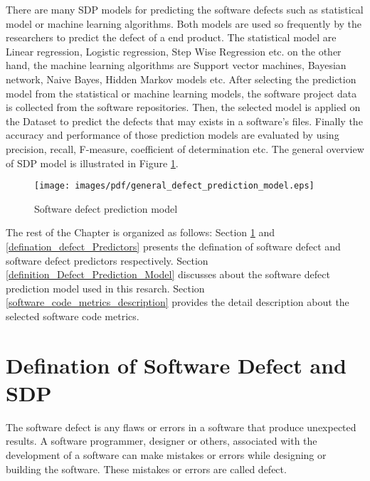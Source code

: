 \documentclass[12pt]{report}
\begin{document}
%
There are many SDP models for predicting the software defects such as statistical model or machine learning algorithms. Both models are used so frequently by the researchers to predict the defect of a end product. The statistical model are Linear regression, Logistic regression, Step Wise Regression etc. on the other hand, the machine learning algorithms are Support vector machines, Bayesian network, Naive Bayes, Hidden Markov models etc.
After selecting the prediction model from the statistical or machine learning models, the software project data is collected from the software repositories. Then, the selected model is applied on the Dataset to predict the defects that may exists in a software's files. Finally the accuracy and performance of those prediction models are evaluated by using precision, recall, F-measure, coefficient of determination etc. The general overview of SDP model is illustrated in Figure \ref{generalized_Defect_Prediction_Model}. 
\begin{figure}[h!]
\center
      \texttt{[image: images/pdf/general\_defect\_prediction\_model.eps]}
		\caption{Software defect prediction model}
		\label{generalized_Defect_Prediction_Model}	
\end{figure}
The rest of the Chapter is organized as follows: Section \ref{defination_defect} and \ref{defination_defect_Predictors} presents the defination of software defect and software defect predictors respectively. Section \ref{definition_Defect_Prediction_Model} discusses about the software defect prediction model used in this resarch. Section \ref{software_code_metrics_description} provides the detail description about the selected software code metrics.  
\section{Defination of Software Defect and SDP }
\label{defination_defect}
The software defect is any flaws or errors in a software that produce unexpected results. A software programmer, designer or others, associated with the development of a software can make mistakes or errors while designing or building the software. These mistakes or errors are called defect.
\end{document}
